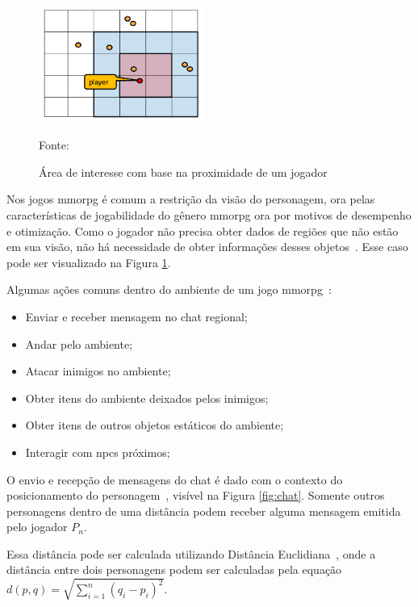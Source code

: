 \begin{figure}[htb!]
\caption{Área de interesse com base na proximidade de um jogador}
\label{fig:proximidade}
\includegraphics[height=3.8cm]{img/cap2/proximidade.png}
\centering

Fonte:~\cite{albion_online_unite}
\end{figure}



Nos jogos \ac{mmorpg} é comum a restrição da visão do personagem, ora pelas características de jogabilidade do gênero \ac{mmorpg} ora por motivos de desempenho e otimização.
%
Como o jogador não precisa obter dados de regiões que não estão em sua visão, não há necessidade de obter informações desses objetos~\cite{albion_online_unite}.
%
Esse caso pode ser visualizado na Figura \ref{fig:proximidade}.



Algumas ações comuns dentro do ambiente de um jogo \ac{mmorpg}~\cite{mmorpg_culture}:

\begin{itemize}
  \item Enviar e receber mensagem no chat regional;
  \item Andar pelo ambiente;
  \item Atacar inimigos no ambiente;
  \item Obter itens do ambiente deixados pelos inimigos;
  \item Obter itens de outros objetos estáticos do ambiente;
  \item Interagir com \ac{npcs} próximos;
\end{itemize}



O envio e recepção de mensagens do chat é dado com o contexto do posicionamento do personagem~\cite{albion_online_unite}, visível na Figura \ref{fig:chat}.
%
Somente outros personagens dentro de uma distância podem receber alguma mensagem emitida pelo jogador $P_n$.



Essa distância pode ser calculada utilizando Distância Euclidiana~\cite{Deza2009Aug}, onde a distância entre dois personagens podem ser calculadas pela equação $d(p, q) = \sqrt{\sum_{i=1}^{n}(q_i - p_i)^2}$.



